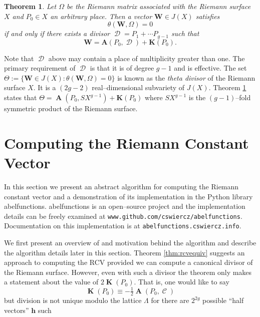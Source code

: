 \documentclass[12pt]{article}
\newtheorem{theorem}{Theorem}
\theoremstyle{definition}
\DeclareMathOperator{\DivC}{\mathcal{C}}
\DeclareMathOperator{\DivD}{\mathcal{D}}
\DeclareMathOperator{\RCV}{\boldsymbol{K}}
\DeclareMathOperator{\Abel}{\boldsymbol{A}}
\begin{document}
\begin{theorem} \label{thm:thetadivisor}
  Let $\Omega$ be the Riemann matrix associated with the Riemann surface
  $X$ and $P_0 \in X$ an arbitrary place. Then a vector $\boldsymbol{W}
  \in J(X)$ satisfies
  \begin{equation} \label{eqn:thetadivisor1}
    \theta(\boldsymbol{W}, \Omega) = 0
  \end{equation}
  if and only if there exists a divisor $\DivD = P_1 + \cdots P_{g-1}$
  such that
  \begin{equation} \label{eqn:thetadivisor2}
    \boldsymbol{W} = \boldsymbol{A}(P_0, \DivD) + \boldsymbol{K}(P_0).
  \end{equation}
\end{theorem}
Note that $\DivD$ above may contain a place of multiplicity greater than
one. The primary requirement of $\DivD$ is that it is of degree $g-1$ and
is effective. The set $\Theta := \{ \boldsymbol{W} \in J(X) :
\theta(\boldsymbol{W},\Omega) = 0\}$ is known as the {\it theta divisor}
of the Riemann surface $X$. It is a $(2g-2)$ real--dimensional
subvariety of $J(X)$. Theorem \ref{thm:thetadivisor} states that $\Theta
= \Abel\left(P_0,SX^{g-1}\right) + \boldsymbol{K}(P_0)$ where $SX^{g-1}$
is the $(g-1)$--fold symmetric product of the Riemann surface.




\section{Computing the Riemann Constant Vector}





In this section we present an abstract algorithm for computing the
Riemann constant vector and a demonstration of its implementation in the
Python library {\sc abelfunctions}. {\sc abelfunctions} is an
open--source project and the implementation details can be freely
examined at \verb=www.github.com/cswiercz/abelfunctions=. Documentation
on this implementation is at \verb=abelfunctions.cswiercz.info=.

We first present an overview of and motivation behind the algorithm and
describe the algorithm details later in this section. Theorem
\ref{thm:rcvequiv} suggests an approach to computing the RCV provided we
can compute a canonical divisor of the Riemann surface. However, even
with such a divisor the theorem only makes a statement about the value
of $2\RCV(P_0)$. That is, one would like to say
\[
\RCV(P_0) \equiv - \tfrac{1}{2} \Abel(P_0,\DivC)
\]
but division is not unique modulo the lattice $\Lambda$ for there are
$2^{2g}$ possible ``half vectors'' $\boldsymbol{h}$ such 
\end{document}
